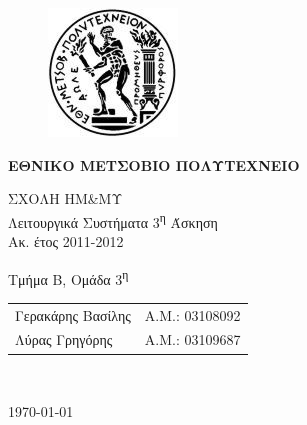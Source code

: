 \begin{titlepage}
\begin{center}
\begin{figure}[t] 
     \includegraphics[scale=0.7]{title/ntua_logo}
\end{figure}
\begin{LARGE}\textbf{ΕΘΝΙΚΟ ΜΕΤΣΟΒΙΟ ΠΟΛΥΤΕΧΝΕΙΟ\\}\end{LARGE}
\vspace{2cm}
\begin{Large}
ΣΧΟΛΗ ΗΜ\&ΜΥ\\
Λειτουργικά Συστήματα
3\textsuperscript{η} Άσκηση\\
Ακ. έτος 2011-2012\\
\end{Large}
\vspace{5cm}
\Large Τμήμα Β, Ομάδα 3\textsuperscript{η}\\
\vspace{1cm}
\begin{tabular}{l r}
\Large{Γερακάρης Βασίλης}&
\large{Α.Μ.: 03108092}\\
\Large{Λύρας Γρηγόρης}&
\large{Α.Μ.: 03109687}\\
\end{tabular}\\
\vspace{5cm}

\vfill
\large\today\\
\end{center}
\end{titlepage}

